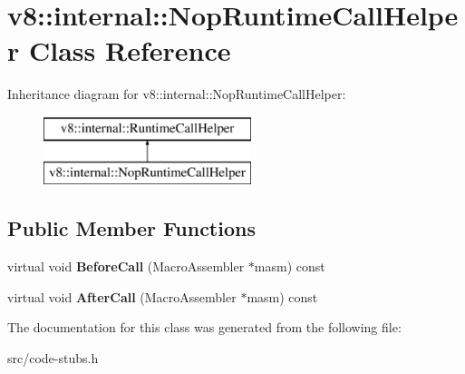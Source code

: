 \hypertarget{classv8_1_1internal_1_1_nop_runtime_call_helper}{}\section{v8\+:\+:internal\+:\+:Nop\+Runtime\+Call\+Helper Class Reference}
\label{classv8_1_1internal_1_1_nop_runtime_call_helper}
Inheritance diagram for v8\+:\+:internal\+:\+:Nop\+Runtime\+Call\+Helper\+:\begin{figure}[H]
\begin{center}
\leavevmode
\includegraphics[height=2.000000cm]{classv8_1_1internal_1_1_nop_runtime_call_helper}
\end{center}
\end{figure}
\subsection*{Public Member Functions}
\begin{DoxyCompactItemize}
\item 
\hypertarget{classv8_1_1internal_1_1_nop_runtime_call_helper_ab256ad57e18cfdf59ee52ea09cad8461}{}virtual void {\bfseries Before\+Call} (Macro\+Assembler $\ast$masm) const \label{classv8_1_1internal_1_1_nop_runtime_call_helper_ab256ad57e18cfdf59ee52ea09cad8461}

\item 
\hypertarget{classv8_1_1internal_1_1_nop_runtime_call_helper_adcf458c33ddfd80af2aadb3220017547}{}virtual void {\bfseries After\+Call} (Macro\+Assembler $\ast$masm) const \label{classv8_1_1internal_1_1_nop_runtime_call_helper_adcf458c33ddfd80af2aadb3220017547}

\end{DoxyCompactItemize}


The documentation for this class was generated from the following file\+:\begin{DoxyCompactItemize}
\item 
src/code-\/stubs.\+h\end{DoxyCompactItemize}
